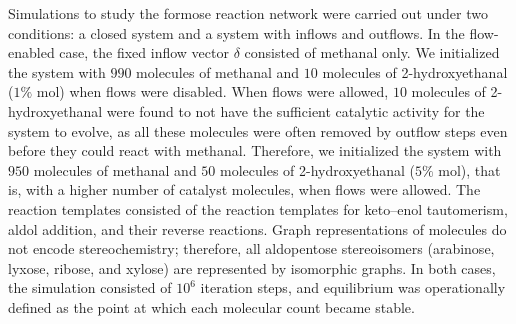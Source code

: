 Simulations to study the formose reaction network were carried out under two conditions: a closed system and a system with inflows and outflows. In the flow-enabled case, the fixed inflow vector $\delta$ consisted of methanal only.
We initialized the system with $990$ molecules of methanal and $10$ molecules of 2-hydroxyethanal ($1 \%$ mol) when flows were disabled. When flows were allowed, $10$ molecules of 2-hydroxyethanal were found to not have the sufficient catalytic activity for the system to evolve, as all these molecules were often removed by outflow steps even before they could react with methanal. Therefore, we initialized the system with $950$ molecules of methanal and $50$ molecules of 2-hydroxyethanal ($5 \%$ mol), that is, with a higher number of catalyst molecules, when flows were allowed. The reaction templates consisted of the reaction templates for keto–enol tautomerism, aldol addition, and their reverse reactions. Graph representations of molecules do not encode stereochemistry; therefore, all aldopentose stereoisomers (arabinose, lyxose, ribose, and xylose) are represented by isomorphic graphs. In both cases, the simulation consisted of $10^6$ iteration steps, and equilibrium was operationally defined as the point at which each molecular count became stable.

